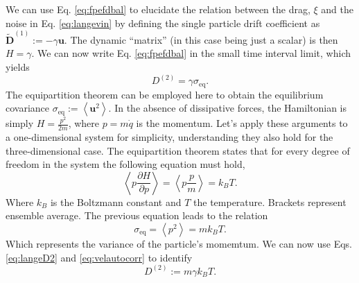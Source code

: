 \documentclass[ twoside,openright,titlepage,numbers=noenddot,%
headinclude,footinclude,cleardoublepage=empty,abstract=on,
BCOR=5mm,paper=b5,fontsize=11pt, dvipsnames
]{scrreprt}
\renewcommand{\vec}[1]{\bm{#1}}
\newcommand{\kT}{k_B T}
\newcommand{\ppos}{q}
\newcommand{\pvel}{u}
\begin{document}
We can use Eq. \eqref{eq:fpefdbal} to elucidate the relation between the drag, $\xi$ and the noise in Eq. \eqref{eq:langevin} by defining the single particle drift coefficient as $\widetilde{\vec{D}}^{(1)} := -\gamma \vec{\pvel}$. The dynamic ``matrix'' (in this case being just a scalar) is then $H = \gamma$. We can now write Eq. \eqref{eq:fpefdbal} in the small time interval limit, which yields
\begin{equation}
  \label{eq:langeD2}
  D^{(2)} = \gamma\sigma_{\text{eq}}.
\end{equation}
The equipartition theorem can be employed here to obtain the equilibrium covariance $\sigma_{\text{eq}} := \left\langle\vec{\pvel}^2\right\rangle$.
In the absence of dissipative forces, the Hamiltonian is simply $H = \frac{p^2}{2m}$, where $p = m\dot{\ppos}$ is the momentum.
Let's apply these arguments to a one-dimensional system for simplicity, understanding they also hold for the three-dimensional case. The equipartition theorem states that for every degree of freedom in the system the following equation must hold,
\begin{equation}
  \left\langle p \frac{\partial H}{\partial p}\right\rangle = \left\langle p \frac{p}{m}\right\rangle = k_BT.
\end{equation}
Where $k_B$ is the Boltzmann constant and $T$ the temperature. Brackets represent ensemble average.
The previous equation leads to the relation
\begin{equation}
  \label{eq:velautocorr}
  \sigma_{\text{eq}} = \left\langle p^2\right\rangle = m k_BT.
\end{equation}
Which represents the variance of the particle's momemtum. We can now use Eqs. \eqref{eq:langeD2} and \eqref{eq:velautocorr} to identify
\begin{equation}
  \label{eq:langenoiseamp}
  D^{(2)} := m\gamma\kT.
\end{equation}
\end{document}
